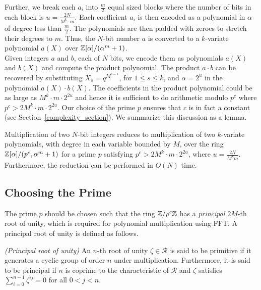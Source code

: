 \documentclass[11pt]{article}
\begin{document}
Further, we break each $a_i$ into $\frac{m}{2}$ equal sized blocks
where the number of bits in each block is $u = \frac{2N}{M^k\cdot m}$.
Each coefficient $a_i$ is then encoded as a polynomial in $\alpha$ of
degree less than $\frac{m}{2}$. The polynomials are then padded with
zeroes to stretch their degrees to $m$. Thus, the $N$-bit number $a$
is converted to a $k$-variate polynomial $a(X)$ over
$\mathbb{Z}[\alpha]/(\alpha^m + 1)$.\\

Given integers $a$ and $b$, each of $N$ bits, we encode them as
polynomials $a(X)$ and $b(X)$ and compute the product polynomial. The
product $a\cdot b$ can be recovered by substituting $X_s =
q^{M^{s-1}}$, for $1\leq s\leq k$, and $\alpha = 2^u$ in the
polynomial $a(X)\cdot b(X)$.  The coefficients in the product
polynomial could be as large as $M^k\cdot m\cdot 2^{2u}$ and hence it
is sufficient to do arithmetic modulo $p^c$ where $p^c > 2M^k\cdot
m\cdot 2^{2u}$. Our choice of
the prime $p$ ensures that $c$ is in fact a constant (see
Section~\ref{complexity_section}). We summarize this discussion as a lemma.

\begin{lemma}\label{lem:encoding-time}
  Multiplication of two $N$-bit integers reduces to
  multiplication of two $k$-variate polynomials, with degree in each
  variable bounded by $M$, over the ring $\mathbb{Z}[\alpha]/(p^c,\alpha^m +
  1)$ for a prime $p$ satisfying $p^c > 2M^k\cdot m \cdot 2^{2u}$,
  where $u=\frac{2N}{M^km}$. Furthermore, the reduction can be
  performed in $O(N)$ time.
\end{lemma}


\subsection{Choosing the Prime}\label{prime_section}

The prime $p$ should be chosen such that the ring $\mathbb{Z}/p^c\mathbb{Z}$ has a
\emph{principal} $2M$-th root of unity, which is required for
polynomial multiplication using FFT. A principal root of unity is
defined as follows.

\begin{definition}\label{def-principal-root}
\emph{\textsf{(Principal root of unity)}} An $n$-th root of unity
$\zeta\in \mathcal{R}$ is said to be primitive if it generates a
cyclic group of order $n$ under multiplication. Furthermore, it is
said to be principal if $n$ is coprime to the characteristic of
$\mathcal{R}$ and $\zeta$ satisfies $\sum_{i=0}^{n-1}\zeta^{ij}=0$ for
all $0< j < n$.
\end{definition}
\end{document}
